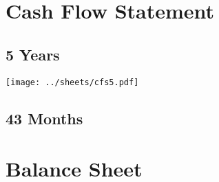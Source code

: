 \documentclass[12pt,a4paper,oneside]{book}
\begin{document}
\chapter{Cash Flow Statement}
\label{cfs}

\section{5 Years}
\begin{center}
\texttt{[image: ../sheets/cfs5.pdf]}
\end{center}
\section{43 Months}


\chapter{Balance Sheet}
\label{bs}


\newpage
\thispagestyle{empty} 
\null
\end{document}
